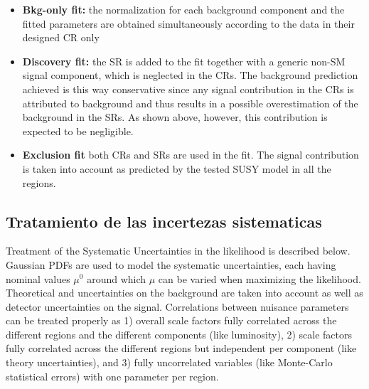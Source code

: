 \begin{itemize}
\item {\bf Bkg-only fit:} the normalization for each background component and the fitted parameters are obtained simultaneously according to the data in their designed CR only
\item {\bf Discovery fit:} the SR is added to the fit together with a generic non-SM signal component, which is neglected in the CRs. The background prediction achieved is this
way conservative since any signal contribution in the CRs is attributed to background and thus results in a possible overestimation of the background in the SRs. As shown above, however, this contribution is expected to be negligible.
\item {\bf Exclusion fit} both CRs and SRs are used in the fit. The signal contribution is taken into account as predicted by the tested SUSY model in all the regions.
\end{itemize}






\subsection{Tratamiento de las incertezas sistematicas} \label{sec:fit_syst}

Treatment of the Systematic Uncertainties in the likelihood is described below. Gaussian PDFs are used
to model the systematic uncertainties, each having nominal values $\mu^{0}$ around which $\mu$ can be varied when
maximizing the likelihood. Theoretical and uncertainties on the background are taken into account as
well as detector uncertainties on the signal. Correlations between nuisance parameters can be treated
properly as 1) overall scale factors fully correlated across the different regions and the different components
(like luminosity), 2) scale factors fully correlated across the different regions but independent per component
(like theory uncertainties), and 3) fully uncorrelated variables (like Monte-Carlo statistical
errors) with one parameter per region. %



